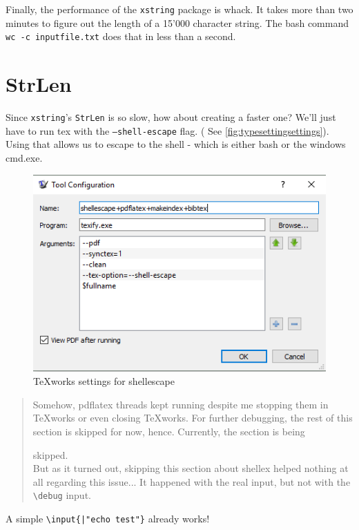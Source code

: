 \documentclass{article} \usepackage[utf8]{inputenc}
\newcommand{\code}[1]{\colorbox{codebggray}{{\texttt{#1}}}}
\newif\ifrunshellex
\begin{document}
Finally, the performance of the \texttt{xstring} package is whack. It takes more than two minutes to figure out the length of a 15'000 character string. The bash command \texttt{wc -c inputfile.txt} does that in less than a second.
\clearpage
\section{StrLen}
Since \texttt{xstring}'s \texttt{StrLen} is so slow, how about creating a faster one?
We'll just have to run tex with the \texttt{--shell-escape} flag. ( See \autoref{fig:typesettingsettings}). Using that allows us to escape to the shell - which is either bash or the windows cmd.exe.

\begin{figure}[htbp]
\includegraphics{typesettingsettings}
\caption{TeXworks settings for shellescape}
\label{fig:typesettingsettings}
\end{figure}

\begin{quote}
Somehow, pdflatex threads kept running despite me stopping them in TeXworks or even closing TeXworks. For further debugging, the rest of this section is skipped for now, hence. Currently, the section is being
\ifrunshellex
run.\\
\else
skipped.\\
\fi
But as it turned out, skipping this section about shellex helped nothing at all regarding this issue... It happened with the real input, but not with the \code{\textbackslash debug} input.
\end{quote}
\ifrunshellex %

A simple \texttt{\textbackslash input\{|"echo test"\}} already works!

\end{document}
